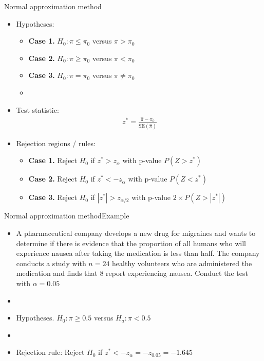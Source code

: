 \documentclass[xcolor=dvipsnames]{beamer}
\begin{document}
\begin{frame}{Normal approximation method}
	\begin{itemize}
		\item Hypotheses:  \pause
		\begin{itemize}
			\item \textbf{Case 1.} $H_0: \pi \leq \pi_0$ versus $\pi > \pi_0$  \pause
			\item \textbf{Case 2.} $H_0: \pi \geq \pi_0$ versus $\pi < \pi_0$  \pause
			\item \textbf{Case 3.} $H_0: \pi = \pi_0$ versus $\pi \neq \pi_0$  \pause
			\item[]
		\end{itemize}
		
		\item Test statistic:  \pause
		\begin{gather*}
		z^* = \frac{\hat{\pi}-\pi_0}{\text{SE}(\hat{\pi})}
		\end{gather*}  \pause
		
		\item Rejection regions / rules:  \pause
		\begin{itemize}
			\item \textbf{Case 1.} Reject $H_0$ if $z^* > z_{\alpha}$ with p-value $P(Z > z^*)$ \pause
			\item \textbf{Case 2.} Reject $H_0$ if $z^* < -z_{\alpha}$ with p-value $P(Z < z^*)$ \pause
			\item \textbf{Case 3.} Reject $H_0$ if $|z^*| > z_{\alpha / 2}$ with p-value $2\times P(Z > |z^*|)$
		\end{itemize}
	\end{itemize}
\end{frame}

\begin{frame}{Normal approximation method}{Example}
	\begin{itemize}
		\item A pharmaceutical company develops a new drug for migraines and wants to determine if there is evidence that the proportion of all humans who will experience nausea after taking the medication is less than half. The company conducts a study with $n = 24$ healthy volunteers who are administered the medication and finds that 8 report experiencing nausea. Conduct the test with $\alpha = 0.05$  \pause
		\item[]
		\item Hypotheses. $H_0: \pi \geq 0.5$ versus $H_a: \pi < 0.5$  \pause
		\item[]
		\item Rejection rule: Reject $H_0$ if $z^* < -z_{\alpha} =  -z_{0.05} = - 1.645$
	\end{itemize}
\end{frame}
\end{document}
